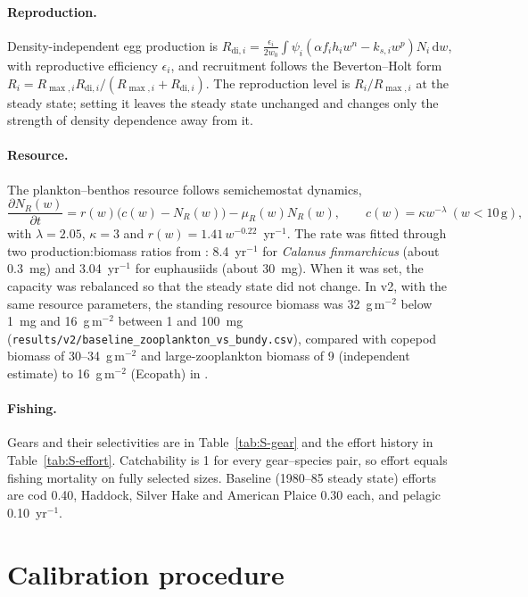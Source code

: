 \documentclass[11pt,letterpaper,fleqn]{article}
\newcommand{\yr}{yr$^{-1}$}
\newcommand{\gm}{g\,m$^{-2}$}
\begin{document}
\paragraph{Reproduction.} Density-independent egg production is $R_{\mathrm{di},i}=\frac{\epsilon_i}{2w_0}\int\psi_i(\alpha f_ih_iw^{n}-k_{s,i}w^{p})N_i\,\mathrm{d}w$, with reproductive efficiency $\epsilon_i$, and recruitment follows the Beverton--Holt form $R_i=R_{\max,i}R_{\mathrm{di},i}/(R_{\max,i}+R_{\mathrm{di},i})$. The reproduction level is $R_i/R_{\max,i}$ at the steady state; setting it leaves the steady state unchanged and changes only the strength of density dependence away from it.

\paragraph{Resource.} The plankton--benthos resource follows semichemostat dynamics,
\begin{equation}
\frac{\partial N_R(w)}{\partial t}=r(w)\big(c(w)-N_R(w)\big)-\mu_R(w)N_R(w),\qquad c(w)=\kappa w^{-\lambda}\ (w<10\,\mathrm{g}),
\end{equation}
with $\lambda=2.05$, $\kappa=3$ and $r(w)=1.41\,w^{-0.22}$~\yr{}. The rate was fitted through two production:biomass ratios from \textcite{bundy2004mass}: 8.4~\yr{} for \textit{Calanus finmarchicus} (about 0.3~mg) and 3.04~\yr{} for euphausiids (about 30~mg). When it was set, the capacity was rebalanced so that the steady state did not change. In v2, with the same resource parameters, the standing resource biomass was 32~\gm{} below 1~mg and 16~\gm{} between 1 and 100~mg (\nolinkurl{results/v2/baseline_zooplankton_vs_bundy.csv}), compared with copepod biomass of 30--34~\gm{} and large-zooplankton biomass of 9 (independent estimate) to 16~\gm{} (Ecopath) in \textcite{bundy2004mass}.

\paragraph{Fishing.} Gears and their selectivities are in Table~\ref{tab:S-gear} and the effort history in Table~\ref{tab:S-effort}. Catchability is 1 for every gear--species pair, so effort equals fishing mortality on fully selected sizes. Baseline (1980--85 steady state) efforts are cod 0.40, Haddock, Silver Hake and American Plaice 0.30 each, and pelagic 0.10~\yr{}.

\section{Calibration procedure}\label{sec:S-calib}
\end{document}
